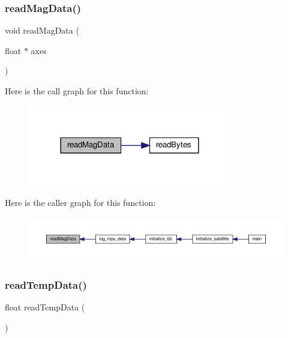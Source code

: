 \subsubsection{\texorpdfstring{read\+Mag\+Data()}{readMagData()}}
{\footnotesize\ttfamily void read\+Mag\+Data (\begin{DoxyParamCaption}\item[{float $\ast$}]{axes }\end{DoxyParamCaption})}

Here is the call graph for this function\+:\nopagebreak
\begin{figure}[H]
\begin{center}
\leavevmode
\includegraphics[width=252pt]{i2c-interface_8c_a121c45c907088a8dcb84c0d72ded4f2b_cgraph}
\end{center}
\end{figure}
Here is the caller graph for this function\+:\nopagebreak
\begin{figure}[H]
\begin{center}
\leavevmode
\includegraphics[width=350pt]{i2c-interface_8c_a121c45c907088a8dcb84c0d72ded4f2b_icgraph}
\end{center}
\end{figure}
\mbox{\label{i2c-interface_8c_aa12b154e59ddb443b65da8f4458146db}} 
\subsubsection{\texorpdfstring{read\+Temp\+Data()}{readTempData()}}
{\footnotesize\ttfamily float read\+Temp\+Data (\begin{DoxyParamCaption}{ }\end{DoxyParamCaption})}

